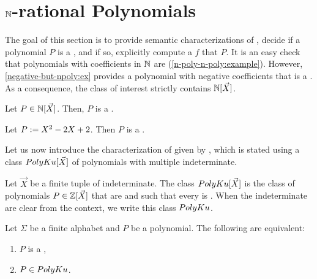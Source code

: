 \section{$\mathbb{N}$-rational Polynomials}
\label{polynomials:sec}

The goal of this section is to provide semantic characterizations of
, decide if a polynomial $P$ is a
, and if so, explicitly compute a
 $f$ that  $P$. It is an easy
check that polynomials with coefficients in $\mathbb{N}$ are  (\cref{n-poly-n-poly:example}). However,
\cref{negative-but-npoly:ex} provides a polynomial with negative coefficients
that is a . As a consequence, the class of
interest strictly contains $\mathbb{N}[\vec{X}]$.

\begin{fact}
    \label{n-poly-n-poly:example}
    Let $P \in \mathbb{N}[\vec{X}]$. Then, $P$
    is a .
\end{fact}

\begin{example}
    \label{negative-but-npoly:ex}
    Let $P \mathrel{:=} X^2 -2X + 2$. Then $P$
    is a .
\end{example}

Let us now introduce the characterization of 
given by \citeauthor{KARH77}, which is stated using a class
$\CoveredPoly[\vec{X}]$ of polynomials with multiple indeterminate.

\begin{definition}
    Let $\vec{X}$ be a finite tuple of indeterminate.
    The class $\CoveredPoly[\vec{X}]$
    is the class of polynomials $P \in \mathbb{Z}[\vec{X}]$
    that are 
    and such that every  is .
    When the indeterminate are clear from the context, we write
    this class $\CoveredPoly$.
\end{definition}

\begin{faketheorem} 
    \label{karh:thm}
    Let $\Sigma$ be a finite alphabet
    and $P$ be a polynomial. The following are equivalent:
    \begin{enumerate}
        \item $P$ is a ,
        \item $P \in \CoveredPoly$.
    \end{enumerate}
\end{faketheorem}


